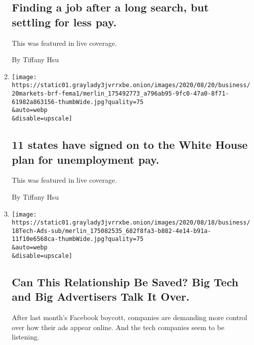 \begin{enumerate}
  \hypertarget{finding-a-job-after-a-long-search-but-settling-for-less-pay}{%
  \subsection{Finding a job after a long search, but settling for less
  pay.}\label{finding-a-job-after-a-long-search-but-settling-for-less-pay}}

  This was featured in live coverage.

  By Tiffany Hsu
\item
  \href{/live/2020/08/20/business/stock-market-today-coronavirus/11-states-have-signed-on-to-the-white-house-plan-for-unemployment-pay}{}

  \texttt{[image: https://static01.graylady3jvrrxbe.onion/images/2020/08/20/business/20markets-brf-fema1/merlin\_175492773\_a796ab95-9fc0-47a0-8f71-61982a863156-thumbWide.jpg?quality=75\\\&auto=webp\\\&disable=upscale]}

  \hypertarget{11-states-have-signed-on-to-the-white-house-plan-for-unemployment-pay}{%
  \subsection{11 states have signed on to the White House plan for
  unemployment
  pay.}\label{11-states-have-signed-on-to-the-white-house-plan-for-unemployment-pay}}

  This was featured in live coverage.

  By Tiffany Hsu
\item
  \href{/2020/08/19/business/media/advertising-tech-amazon-apple-facebook-google.html}{}

  \texttt{[image: https://static01.graylady3jvrrxbe.onion/images/2020/08/18/business/18Tech-Ads-sub/merlin\_175082535\_682f8fa3-b882-4e14-b91a-11f10e6568ca-thumbWide.jpg?quality=75\\\&auto=webp\\\&disable=upscale]}

  \hypertarget{can-this-relationship-be-saved-big-tech-and-big-advertisers-talk-it-over}{%
  \subsection{Can This Relationship Be Saved? Big Tech and Big
  Advertisers Talk It
  Over.}\label{can-this-relationship-be-saved-big-tech-and-big-advertisers-talk-it-over}}

  After last month's Facebook boycott, companies are demanding more
  control over how their ads appear online. And the tech companies seem
  to be listening.


\end{enumerate}
